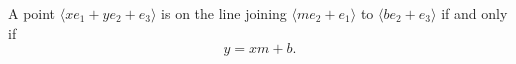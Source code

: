 A point $\langle x e_1 + y e_2 + e_3 \rangle$ is on the line joining $\langle m e_2 + e_1 \rangle$ to $\langle b e_2 + e_3 \rangle$ if and only if
$$y = x m + b.$$
